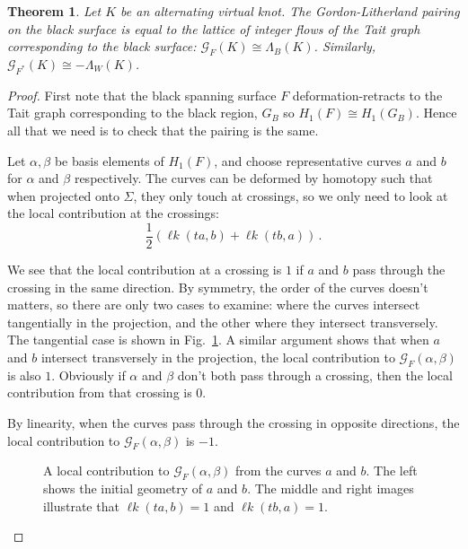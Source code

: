\documentclass[12pt]{report}
\newcommand{\lk}{\operatorname{\ell\textit{k}}}
\newtheorem*{theorem}{Theorem}
\begin{document}
\begin{theorem}
Let $K$ be an alternating virtual knot. The Gordon-Litherland pairing on the black surface  is equal to the lattice of integer flows of the Tait graph corresponding to the black surface: $\mathcal{G}_{F}(K) \cong \Lambda_{B}(K)$. Similarly, $\mathcal{G}_{F^{*}}(K) \cong -\Lambda_{W}(K)$.
\end{theorem}

\begin{proof}
First note that the black spanning surface $F$ deformation-retracts to the Tait graph corresponding to the black region, $G_{B}$ so $H_{1}(F) \cong H_{1}(G_{B})$. Hence all that we need is to check that the pairing is the same.

Let $\alpha, \beta$ be basis elements of $H_{1}(F)$, and choose representative curves $a$ and $b$ for $\alpha$ and $\beta$ respectively. The curves can be deformed by homotopy such that when projected onto $\Sigma$, they only touch at crossings, so we only need to look at the local contribution at the crossings:
\[\dfrac{1}{2} \left( \lk(t a, b) + \lk(t b, a) \right)\,.\]

We see that the local contribution at a crossing is $1$ if $a$ and $b$ pass through the crossing in the same direction. By symmetry, the order of the curves doesn't matters, so there are only two cases to examine: where the curves intersect tangentially in the projection, and the other where they intersect transversely. The tangential case is shown in Fig.~\ref{fig:gordon-litherland-pairing-example}. A similar argument shows that when $a$ and $b$ intersect transversely in the projection, the local contribution to $\mathcal{G}_{F}(\alpha, \beta)$ is also $1$. Obviously if $\alpha$ and $\beta$ don't both pass through a crossing, then the local contribution from that crossing is 0.

By linearity, when the curves pass through the crossing in opposite directions, the local contribution to $\mathcal{G}_{F}(\alpha, \beta)$ is $-1$.

\begin{figure}[h!]
	\centering
	\def\svgscale{0.54}
	
	
	\caption{A local contribution to $\mathcal{G}_{F}(\alpha, \beta)$ from the curves $a$ and $b$. The left shows the initial geometry of $a$ and $b$. The middle and right images illustrate that $\lk(ta, b) = 1$ and $\lk(tb, a) = 1$.}
	\label{fig:gordon-litherland-pairing-example}
\end{figure}


\end{proof}
\end{document}
